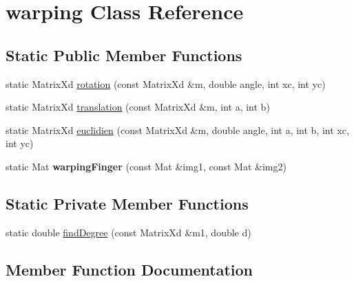 \hypertarget{classwarping}{}\section{warping Class Reference}
\label{classwarping}
\subsection*{Static Public Member Functions}
\begin{DoxyCompactItemize}
\item 
static Matrix\+Xd \hyperlink{classwarping_a478d01f5448e5264668ea80b1a7eaf12}{rotation} (const Matrix\+Xd \&m, double angle, int xc, int yc)
\item 
static Matrix\+Xd \hyperlink{classwarping_a80292615cbce58308f9e9f905518785f}{translation} (const Matrix\+Xd \&m, int a, int b)
\item 
static Matrix\+Xd \hyperlink{classwarping_a6cb783f67401cf614813d95f8e4120c8}{euclidien} (const Matrix\+Xd \&m, double angle, int a, int b, int xc, int yc)
\item 
static Mat {\bfseries warping\+Finger} (const Mat \&img1, const Mat \&img2)\hypertarget{classwarping_ac0e7bfe96c5f849784d8c9d2fa8e7ab8}{}\label{classwarping_ac0e7bfe96c5f849784d8c9d2fa8e7ab8}

\end{DoxyCompactItemize}
\subsection*{Static Private Member Functions}
\begin{DoxyCompactItemize}
\item 
static double \hyperlink{classwarping_a726105ca6923d8e31db11b8296edcc24}{find\+Degree} (const Matrix\+Xd \&m1, double d)
\end{DoxyCompactItemize}


\subsection{Member Function Documentation}
